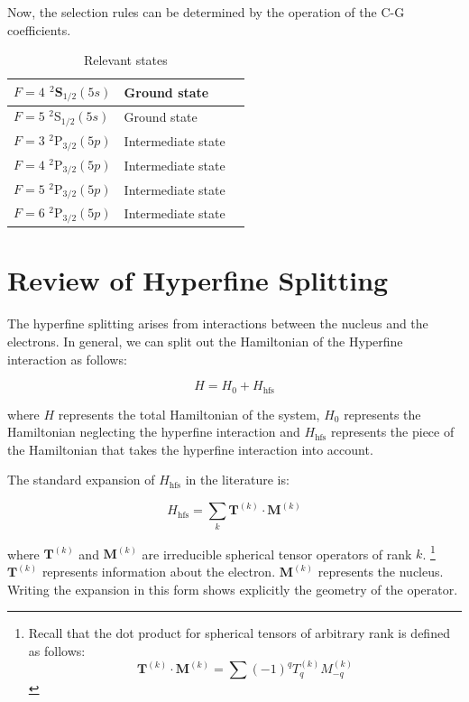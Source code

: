 Now, the selection rules can be determined by the operation of the C-G coefficients. 

\begin{table}[h]
\centering
\begin{tabular}{|l|l|||r|}
\hline
$F=4$ $^2$S$_{1/2} (5s)$ & Ground state  \\ \hline
$F=5$ $^2$S$_{1/2} (5s)$ & Ground state  \\ \hline
$F=3$ $^2$P$_{3/2} (5p)$ & Intermediate state  \\ \hline
$F=4$ $^2$P$_{3/2} (5p)$ & Intermediate state  \\ \hline
$F=5$ $^2$P$_{3/2} (5p)$ & Intermediate state  \\ \hline
$F=6$ $^2$P$_{3/2} (5p)$ & Intermediate state  \\ \hline
\end{tabular}
\caption{Relevant states}
\label{tableOfStates}
\end{table}

\section{Review of Hyperfine Splitting}

The hyperfine splitting arises from interactions between the nucleus and the electrons. In general, we can split out the Hamiltonian of the Hyperfine interaction as follows: 

\begin{equation}
H=H_0+H_{\mathrm{hfs}}
\end{equation}

where $H$ represents the total Hamiltonian of the system, $H_0$ represents the Hamiltonian neglecting the hyperfine interaction and $H_{\mathrm{hfs}}$ represents the piece of the Hamiltonian that takes the hyperfine interaction into account. 

The standard expansion of $H_{\mathrm{hfs}}$ in the literature is:  

\begin{equation}
H_{\mathrm{hfs}}=\sum_k \mathbf{T}^{(k)} \cdot \mathbf{M}^{(k)} \label{hfs_hamiltonian_eqn}
\end{equation}
\cite{schwartz_hyperfine_expansion}
\cite{experimental_hyperfine_alkali_arimondo}
\cite{chinesePhysics}

where $\mathbf{T}^{(k)}$ and $\mathbf{M}^{(k)}$ are irreducible spherical tensor operators of rank $k$.
\footnote{Recall that the dot product for spherical tensors of arbitrary rank is defined as follows:
\begin{equation}\label{TkMk_hyperfine}
\mathbf{T}^{(k)}\cdot\mathbf{M}^{(k)}=\sum (-1)^qT_q^{(k)}M_{-q}^{(k)}
\end{equation}
}
 $\mathbf{T}^{(k)}$ represents information about the electron.
$\mathbf{M}^{(k)}$ represents the nucleus.\cite{experimental_hyperfine_alkali_arimondo}\cite{schwartz_hyperfine_expansion}
\cite{sobelman_spectra}
Writing the expansion in this form shows explicitly the geometry of the operator.

